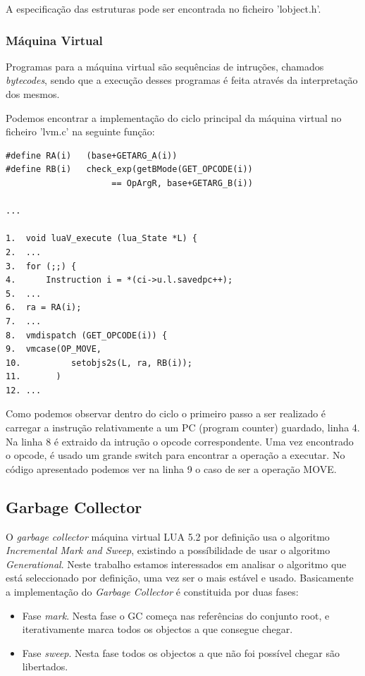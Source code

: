 \documentclass{article}
\begin{document}
A especificação das estruturas pode ser encontrada no ficheiro 'lobject.h'.

\subsubsection{Máquina Virtual}
Programas para a máquina virtual são sequências de intruções, chamados \emph{bytecodes}, sendo que a execução desses programas é feita através da interpretação dos mesmos.

Podemos encontrar a implementação do ciclo principal da máquina virtual no ficheiro 'lvm.c' na seguinte função:
\begin{verbatim}
#define RA(i)   (base+GETARG_A(i))
#define RB(i)   check_exp(getBMode(GET_OPCODE(i)) 
                     == OpArgR, base+GETARG_B(i))

...

1.  void luaV_execute (lua_State *L) {
2.  ...
3.  for (;;) {
4.      Instruction i = *(ci->u.l.savedpc++);
5.  ...
6.  ra = RA(i);
7.  ...
8.  vmdispatch (GET_OPCODE(i)) {
9.  vmcase(OP_MOVE,
10.          setobjs2s(L, ra, RB(i));
11.       )
12. ...
\end{verbatim}

Como podemos observar dentro do ciclo o primeiro passo a ser realizado é carregar a instrução relativamente a um PC (program counter) guardado, linha 4.
Na linha 8 é extraido da intrução o opcode correspondente. Uma vez encontrado o opcode, é usado um grande switch para encontrar a operação a executar. No código apresentado podemos ver na linha 9 o caso de ser a operação MOVE.

%
\subsection{Garbage Collector}
\label{subsec:gc}
%
O \emph{garbage collector}  máquina virtual LUA 5.2 por definição usa o algoritmo \emph{Incremental Mark and Sweep}, existindo a possíbilidade de usar o algoritmo \emph{Generational}.
Neste trabalho estamos interessados em analisar o algoritmo que está seleccionado por definição, uma vez ser o mais estável e usado.
Basicamente a implementação do \emph{Garbage Collector} é constituida por duas fases:
\begin{itemize}
\item Fase \emph{mark}. Nesta fase o GC começa nas referências do conjunto root, e iterativamente marca todos os objectos a que consegue chegar.
\item Fase \emph{sweep}. Nesta fase todos os objectos a que não foi possível chegar são libertados.
\end{itemize}
\end{document}

